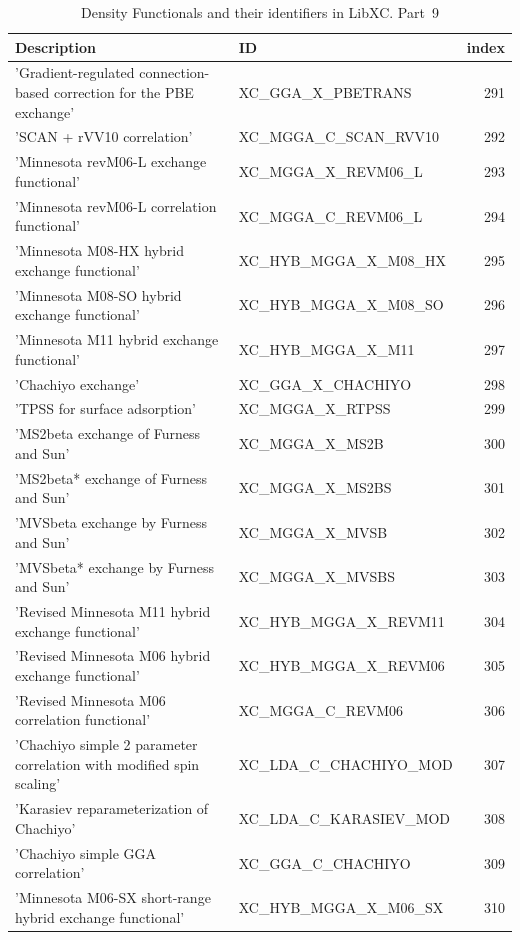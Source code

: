 \documentclass[final,12pt]{article}
\begin{document}
{{{{{{\begin{table}[!h]
\caption{Density Functionals and their identifiers in LibXC. Part~9}
\begin{center}
\begin{tabular}{llr}
\hline
\hline
Description & ID & index\\
\hline
  'Gradient-regulated connection-based correction for the PBE exchange' & XC\_GGA\_X\_PBETRANS  &291\\
  'SCAN + rVV10 correlation' & XC\_MGGA\_C\_SCAN\_RVV10  &292\\
  'Minnesota revM06-L exchange functional' & XC\_MGGA\_X\_REVM06\_L  &293\\
  'Minnesota revM06-L correlation functional' & XC\_MGGA\_C\_REVM06\_L  &294\\
  'Minnesota M08-HX hybrid exchange functional' & XC\_HYB\_MGGA\_X\_M08\_HX  &295\\
  'Minnesota M08-SO hybrid exchange functional' & XC\_HYB\_MGGA\_X\_M08\_SO  &296\\
  'Minnesota M11 hybrid exchange functional' & XC\_HYB\_MGGA\_X\_M11  &297\\
  'Chachiyo exchange' & XC\_GGA\_X\_CHACHIYO  &298\\
  'TPSS for surface adsorption' & XC\_MGGA\_X\_RTPSS  &299\\
  'MS2beta exchange of Furness and Sun' & XC\_MGGA\_X\_MS2B  &300\\
  'MS2beta* exchange of Furness and Sun' & XC\_MGGA\_X\_MS2BS  &301\\
  'MVSbeta exchange by Furness and Sun' & XC\_MGGA\_X\_MVSB  &302\\
  'MVSbeta* exchange by Furness and Sun' & XC\_MGGA\_X\_MVSBS  &303\\
  'Revised Minnesota M11 hybrid exchange functional' & XC\_HYB\_MGGA\_X\_REVM11  &304\\
  'Revised Minnesota M06 hybrid exchange functional' & XC\_HYB\_MGGA\_X\_REVM06  &305\\
  'Revised Minnesota M06 correlation functional' & XC\_MGGA\_C\_REVM06  &306\\
  'Chachiyo simple 2 parameter correlation with modified spin scaling' & XC\_LDA\_C\_CHACHIYO\_MOD  &307\\
  'Karasiev reparameterization of Chachiyo' & XC\_LDA\_C\_KARASIEV\_MOD  &308\\
  'Chachiyo simple GGA correlation' & XC\_GGA\_C\_CHACHIYO  &309\\
  'Minnesota M06-SX short-range hybrid exchange functional' & XC\_HYB\_MGGA\_X\_M06\_SX  &310\\

\end{tabular}
\end{center}
\end{table}}}}}}}
\end{document}
